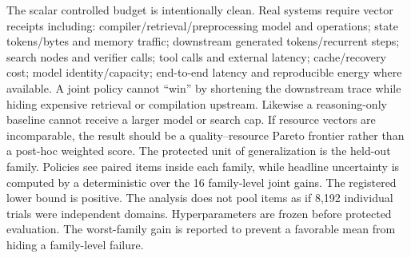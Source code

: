 \markdownRendererDocumentBegin
\markdownRendererSectionBegin
{}\markdownRendererInterblockSeparator
{}The scalar controlled budget is intentionally clean. Real systems require vector receipts including:\markdownRendererInterblockSeparator
{}\markdownRendererUlBeginTight
\markdownRendererUlItem compiler/retrieval/preprocessing model and operations;\markdownRendererUlItemEnd 
\markdownRendererUlItem state tokens/bytes and memory traffic;\markdownRendererUlItemEnd 
\markdownRendererUlItem downstream generated tokens/recurrent steps;\markdownRendererUlItemEnd 
\markdownRendererUlItem search nodes and verifier calls;\markdownRendererUlItemEnd 
\markdownRendererUlItem tool calls and external latency;\markdownRendererUlItemEnd 
\markdownRendererUlItem cache/recovery cost;\markdownRendererUlItemEnd 
\markdownRendererUlItem model identity/capacity;\markdownRendererUlItemEnd 
\markdownRendererUlItem end-to-end latency and reproducible energy where available.\markdownRendererUlItemEnd 
\markdownRendererUlEndTight \markdownRendererInterblockSeparator
{}A joint policy cannot “win” by shortening the downstream trace while hiding expensive retrieval or compilation upstream. Likewise a reasoning-only baseline cannot receive a larger model or search cap. If resource vectors are incomparable, the result should be a quality–resource Pareto frontier rather than a post-hoc weighted score.\markdownRendererInterblockSeparator
{}\markdownRendererSectionBegin
{}\markdownRendererInterblockSeparator
{}The protected unit of generalization is the held-out family. Policies see paired items inside each family, while headline uncertainty is computed by a deterministic  over the 16 family-level joint gains. The registered lower bound is positive.\markdownRendererInterblockSeparator
{}The analysis does not pool items as if 8,192 individual trials were independent domains. Hyperparameters are frozen before protected evaluation. The worst-family gain is reported to prevent a favorable mean from hiding a family-level failure.
\markdownRendererSectionEnd 
\markdownRendererSectionEnd \markdownRendererDocumentEnd
